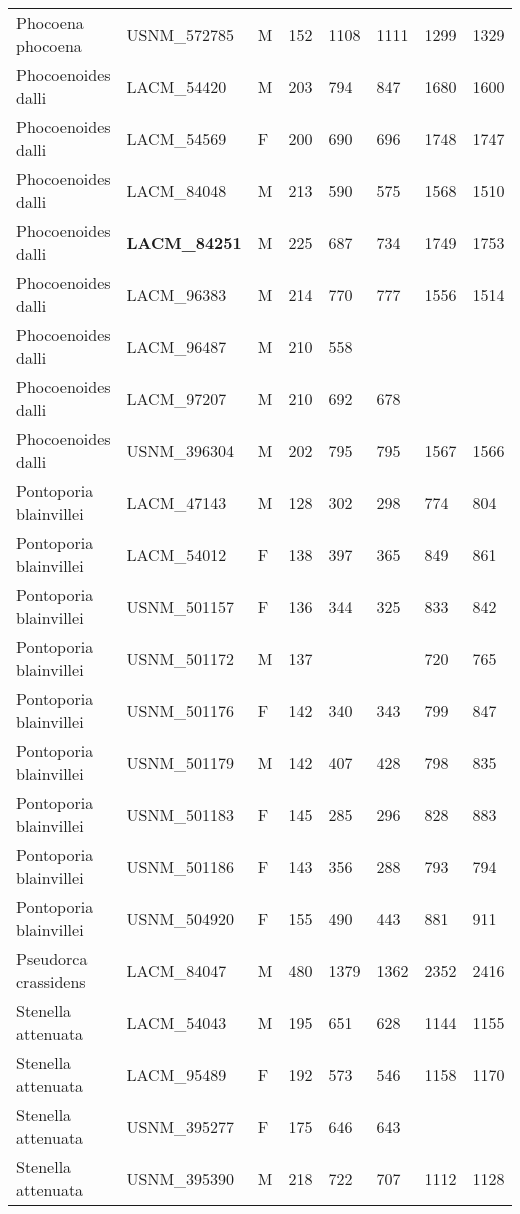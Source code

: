 \begin{longtable}{|p{1in}p{1in}p{.15in}p{.4in}p{.4in}p{.5in}p{.5in}p{.75in}|}
  Phocoena phocoena & USNM\_572785 & M & 152 & 1108 & 1111 & 1299 & 1329 \\ 
  Phocoenoides dalli & LACM\_54420 & M & 203 & 794 & 847 & 1680 & 1600 \\ 
  Phocoenoides dalli & LACM\_54569 & F & 200 & 690 & 696 & 1748 & 1747 \\ 
  Phocoenoides dalli & LACM\_84048 & M & 213 & 590 & 575 & 1568 & 1510 \\ 
  Phocoenoides dalli & \textbf{ LACM\_84251 } & M & 225 & 687 & 734 & 1749 & 1753 \\ 
  Phocoenoides dalli & LACM\_96383 & M & 214 & 770 & 777 & 1556 & 1514 \\ 
  Phocoenoides dalli & LACM\_96487 & M & 210 & 558 &  &  &  \\ 
  Phocoenoides dalli & LACM\_97207 & M & 210 & 692 & 678 &  &  \\ 
  Phocoenoides dalli & USNM\_396304 & M & 202 & 795 & 795 & 1567 & 1566 \\ 
  Pontoporia blainvillei & LACM\_47143 & M & 128 & 302 & 298 & 774 & 804 \\ 
  Pontoporia blainvillei & LACM\_54012 & F & 138 & 397 & 365 & 849 & 861 \\ 
  Pontoporia blainvillei & USNM\_501157 & F & 136 & 344 & 325 & 833 & 842 \\ 
  Pontoporia blainvillei & USNM\_501172 & M & 137 &  &  & 720 & 765 \\ 
  Pontoporia blainvillei & USNM\_501176 & F & 142 & 340 & 343 & 799 & 847 \\ 
  Pontoporia blainvillei & USNM\_501179 & M & 142 & 407 & 428 & 798 & 835 \\ 
  Pontoporia blainvillei & USNM\_501183 & F & 145 & 285 & 296 & 828 & 883 \\ 
  Pontoporia blainvillei & USNM\_501186 & F & 143 & 356 & 288 & 793 & 794 \\ 
  Pontoporia blainvillei & USNM\_504920 & F & 155 & 490 & 443 & 881 & 911 \\ 
  Pseudorca crassidens & LACM\_84047 & M & 480 & 1379 & 1362 & 2352 & 2416 \\ 
  Stenella attenuata & LACM\_54043 & M & 195 & 651 & 628 & 1144 & 1155 \\ 
  Stenella attenuata & LACM\_95489 & F & 192 & 573 & 546 & 1158 & 1170 \\ 
  Stenella attenuata & USNM\_395277 & F & 175 & 646 & 643 &  &  \\ 
  Stenella attenuata & USNM\_395390 & M & 218 & 722 & 707 & 1112 & 1128 \\ 

\end{longtable}
